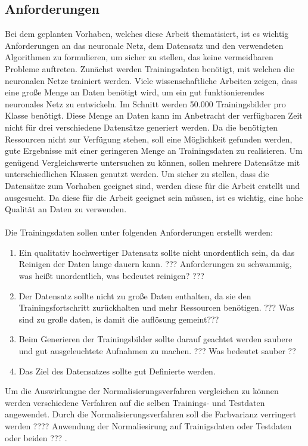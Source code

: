 \documentclass[a4paper,12pt,oneside]{article}
\begin{document}
  \subsection{Anforderungen}\label{s.anforderungen}
Bei dem geplanten Vorhaben, welches diese Arbeit thematisiert, ist es wichtig Anforderungen an das neuronale Netz, dem Datensatz und den verwendeten Algorithmen zu formulieren, um sicher zu stellen, das keine vermeidbaren Probleme auftreten. Zunächst werden Trainingsdaten benötigt, mit welchen die neuronalen Netze trainiert werden. Viele wissenschaftliche Arbeiten zeigen, dass eine große Menge an Daten benötigt wird, um ein gut funktionierendes neuronales Netz zu entwickeln. Im Schnitt werden 50.000 Trainingsbilder pro Klasse benötigt. Diese Menge an Daten kann im Anbetracht der verfügbaren Zeit nicht für drei verschiedene Datensätze generiert werden. Da die benötigten Ressourcen nicht zur Verfügung stehen, soll eine Möglichkeit gefunden werden, gute Ergebnisse mit einer geringeren Menge an Trainingsdaten zu realisieren. Um genügend Vergleichswerte untersuchen zu können, sollen mehrere Datensätze mit unterschiedlichen Klassen genutzt werden. Um sicher zu stellen, dass die Datensätze zum Vorhaben geeignet sind, werden diese für die Arbeit erstellt und ausgesucht. Da diese für die Arbeit geeignet sein müssen, ist es wichtig, eine hohe Qualität an Daten zu verwenden.\\\\
Die Trainingsdaten sollen unter folgenden Anforderungen erstellt werden:
\begin{enumerate} 
\item Ein qualitativ hochwertiger Datensatz sollte nicht unordentlich sein, da das Reinigen der Daten lange dauern kann. ??? Anforderungen zu schwammig, was heißt unordentlich, was bedeutet reinigen? ???
\item Der Datensatz sollte nicht zu große Daten enthalten, da sie den Trainingsfortschritt zurückhalten und mehr Ressourcen benötigen. ??? Was sind zu große daten, is damit die auflösung gemeint???
\item Beim Generieren der Trainingsbilder sollte darauf geachtet werden saubere und gut ausgeleuchtete Aufnahmen zu machen. ??? Was bedeutet sauber ?? 
\item Das Ziel des Datensatzes sollte gut Definierte werden.
\end{enumerate}
Um die Auswirkungne der Normalisierungsverfahren vergleichen zu können werden verschiedene Verfahren auf die selben Trainings- und Testdaten angewendet. Durch die Normalisierungsverfahren soll die Farbvarianz verringert werden ???? Anwendung der Normaliesirung auf Trainigsdaten oder Testdaten oder beiden ??? .
\end{document}
